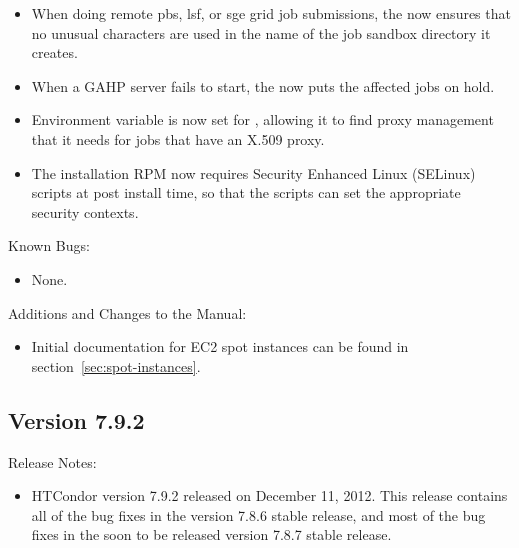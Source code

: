\begin{itemize}
\item When doing remote pbs, lsf, or sge grid job submissions, the
 now ensures that no unusual characters are used in
the name of the job sandbox directory it creates.

\item When a GAHP server fails to start, the  now
puts the affected jobs on hold.

\item Environment variable  is now set for
,
allowing it to find proxy management that it needs for jobs that have an
X.509 proxy.

\item The installation RPM now requires Security Enhanced Linux (SELinux) 
scripts at post install time,
so that the scripts can set the appropriate security contexts.

\end{itemize}

\noindent Known Bugs:

\begin{itemize}

\item None.

\end{itemize}

\noindent Additions and Changes to the Manual:

\begin{itemize}

\item Initial documentation for EC2 spot instances can be found
in section~\ref{sec:spot-instances}.

\end{itemize}


\subsection*{\label{sec:New-7-9-2}Version 7.9.2}

\noindent Release Notes:

\begin{itemize}

\item HTCondor version 7.9.2 released on December 11, 2012.
This release contains all of the bug fixes in the version 7.8.6 
stable release,
and most of the bug fixes in the
soon to be released version 7.8.7 stable release.

\end{itemize}


